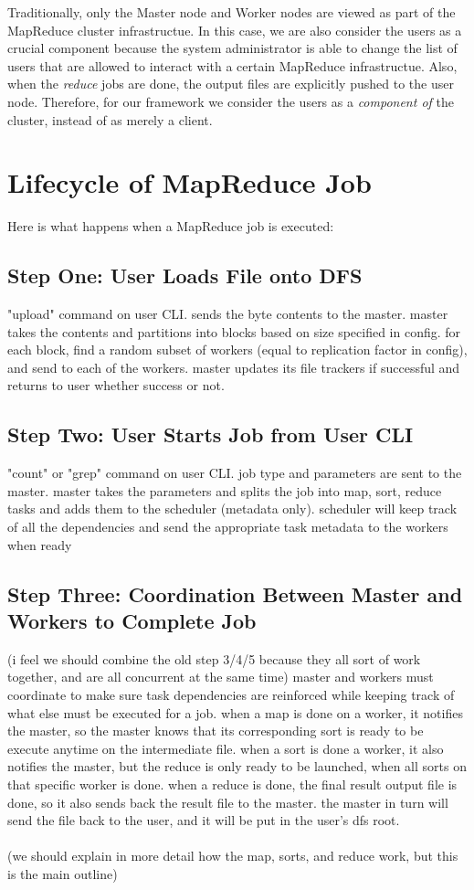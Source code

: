 \documentclass{article} %
\begin{document}
\par\qquad Traditionally, only the Master node and Worker nodes are viewed as part of the MapReduce cluster infrastructue. In this case, we are also consider the users as a crucial component because the system administrator is able to change the list of users that are allowed to interact with a certain MapReduce infrastructue. Also, when the \emph{reduce} jobs are done, the output files are explicitly pushed to the user node. Therefore, for our framework we consider the users as a \emph{component of} the cluster, instead of as merely a client.

\section{Lifecycle of MapReduce Job}
Here is what happens when a MapReduce job is executed:
\subsection*{Step One: User Loads File onto DFS}
"upload" command on user CLI.  sends the byte contents to the master.  master takes the contents and partitions into blocks based on size specified in config.  for each block, find a random subset of workers (equal to replication factor in config), and send to each of the workers.  master updates its file trackers if successful and returns to user whether success or not.
\subsection*{Step Two: User Starts Job from User CLI}
"count" or "grep" command on user CLI.  job type and parameters are sent to the master.  master takes the parameters and splits the job into map, sort, reduce tasks and adds them to the scheduler (metadata only).  scheduler will keep track of all the dependencies and send the appropriate task metadata to the workers when ready
\subsection*{Step Three: Coordination Between Master and Workers to Complete Job}
(i feel we should combine the old step 3/4/5 because they all sort of work together, and are all concurrent at the same time)
master and workers must coordinate to make sure task dependencies are reinforced while keeping track of what else must be executed for a job.  when a map is done on a worker, it notifies the master, so the master knows that its corresponding sort is ready to be execute anytime on the intermediate file.  when a sort is done a worker, it also notifies the master, but the reduce is only ready to be launched, when all sorts on that specific worker is done.  when a reduce is done, the final result output file is done, so it also sends back the result file to the master. the master in turn will send the file back to the user, and it will be put in the user's dfs root.\\\\
(we should explain in more detail how the map, sorts, and reduce work, but this is the main outline)
\end{document}
